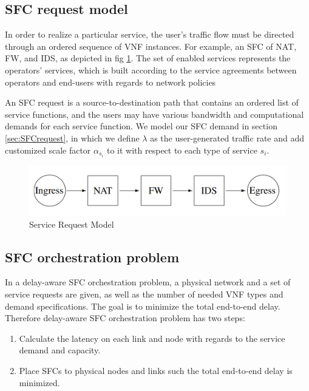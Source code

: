 \subsection{SFC request model}
In order to realize a particular service, the user's traffic flow must be directed through an ordered sequence of VNF instances. For example, an SFC of NAT, FW, and IDS, as depicted in fig \ref{fig:SFCrequestmodel}. The set of enabled services represents the operators'
services, which is built according to the service agreements between
operators and end-users with regards to network policies \cite{xie2016service}

An SFC request is a source-to-destination path that contains an ordered list of service functions, and the users may have various bandwidth and computational demands for each service function. We model our SFC demand in section \ref{sec:SFCrequest}, in which we define $\lambda$ as the user-generated traffic rate and add customized scale factor $\alpha_{s_i}$ to it with respect to each type of service $s_i$.

\begin{figure}
	\centering
	\includegraphics[width=0.9\linewidth]{figs/SFCrequestmodel.PNG}
		\vspace{\baselineskip}
	\caption{Service Request Model \cite{xie2016service}}
	\label{fig:SFCrequestmodel}
\end{figure}

\subsection{SFC orchestration problem}

 In a delay-aware SFC orchestration problem, a physical network and a set of service requests are given, as well as the number of needed VNF types and demand specifications. The goal is to minimize the total end-to-end delay. Therefore delay-aware SFC orchestration problem has two steps:

\begin{enumerate}
	\item Calculate the latency on each link and node with regards to the service demand and capacity.
	\item Place SFCs to physical nodes and links such the total end-to-end delay is minimized.
\end{enumerate}

